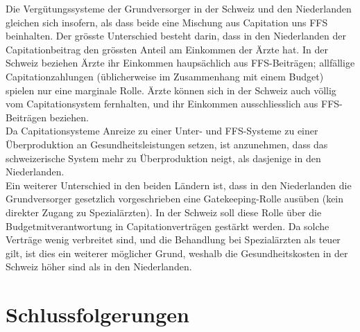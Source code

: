 \documentclass[ngerman,a4paper]{article}
\begin{document}
Die Vergütungssysteme der Grundversorger in der Schweiz und den
Niederlanden gleichen sich insofern, als dass beide eine Mischung aus
Capitation uns FFS beinhalten. Der grösste Unterschied besteht darin,
dass in den Niederlanden der Capitationbeitrag den grössten Anteil am
Einkommen der Ärzte hat. In der Schweiz beziehen Ärzte ihr Einkommen
haupsächlich aus FFS-Beiträgen; allfällige Capitationzahlungen
(üblicherweise im Zusammenhang mit einem Budget) spielen nur eine
marginale Rolle. Ärzte können sich in der Schweiz auch völlig vom
Capitationsystem fernhalten, und ihr Einkommen ausschliesslich aus
FFS-Beiträgen beziehen.\\
Da Capitationsysteme Anreize zu einer Unter- und FFS-Systeme zu einer
Überproduktion an Gesundheitsleistungen setzen, ist anzunehmen, dass das
schweizerische System mehr zu Überproduktion neigt, als dasjenige in den
Niederlanden.\\
Ein weiterer Unterschied in den beiden Ländern ist, dass in den
Niederlanden die Grundversorger gesetzlich vorgeschrieben eine
Gatekeeping-Rolle ausüben (kein direkter Zugang zu Spezialärzten). In
der Schweiz soll diese Rolle über die Budgetmitverantwortung in
Capitationverträgen gestärkt werden. Da solche Verträge wenig verbreitet
sind, und die Behandlung bei Spezialärzten als teuer gilt, ist dies ein
weiterer möglicher Grund, weshalb die Gesundheitskosten in der Schweiz
höher sind als in den Niederlanden.

\section{Schlussfolgerungen}\label{schlussfolgerungen}
\end{document}
